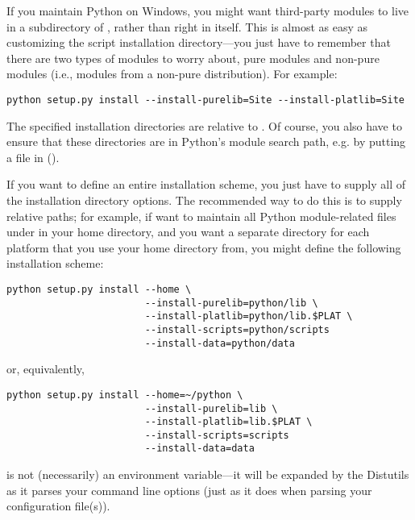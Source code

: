 \documentclass{howto}
\begin{document}
If you maintain Python on Windows, you might want third-party modules to
live in a subdirectory of , rather than right in
 itself.  This is almost as easy as customizing the
script installation directory---you just have to remember that there are
two types of modules to worry about, pure modules and non-pure modules
(i.e., modules from a non-pure distribution).  For example:
\begin{verbatim}
python setup.py install --install-purelib=Site --install-platlib=Site
\end{verbatim}
The specified installation directories are relative to .
Of course, you also have to ensure that these directories are in
Python's module search path, e.g. by putting a  file in
 ().

If you want to define an entire installation scheme, you just have to
supply all of the installation directory options.  The recommended way
to do this is to supply relative paths; for example, if want to maintain
all Python module-related files under  in your home
directory, and you want a separate directory for each platform that you
use your home directory from, you might define the following
installation scheme:
\begin{verbatim}
python setup.py install --home \
                        --install-purelib=python/lib \
                        --install-platlib=python/lib.$PLAT \
                        --install-scripts=python/scripts
                        --install-data=python/data
\end{verbatim}
or, equivalently,
\begin{verbatim}
python setup.py install --home=~/python \
                        --install-purelib=lib \
                        --install-platlib=lib.$PLAT \
                        --install-scripts=scripts
                        --install-data=data
\end{verbatim}
\code{\$PLAT} is not (necessarily) an environment variable---it will be
expanded by the Distutils as it parses your command line options (just
as it does when parsing your configuration file(s)).
\end{document}
